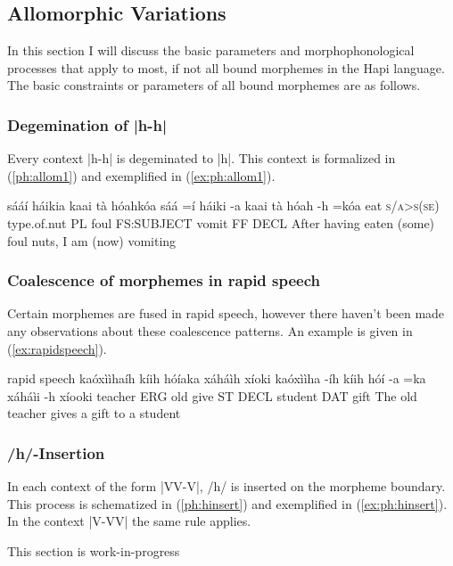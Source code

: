 \documentclass[a4paper, 12pt, oneside]{memoir}
\begin{document}
\subsection{Allomorphic Variations}\label{sallomorphicvariations}
In this section I will discuss the basic parameters and morphophonological processes that apply to most, if not all bound morphemes in the Hapi language. The basic constraints or parameters of all bound morphemes are as follows. 
\subsubsection{Degemination of |h-h|}
Every context |h-h| is degeminated to |h|. This context is formalized in (\ref{ph:allom1}) and exemplified in (\ref{ex:ph:allom1}).
\begin{examples}
\ex \label{ph:allom1} 
\end{examples}
\begin{examples}
\ex\label{ex:ph:allom1}
\words sááí háikia kaai tà hóahkóa
\bits sáá =í háiki -a kaai tà hóah -h =kóa
\gloss eat \textsc{\textup{s/a>s(se)}} type.of.nut PL foul FS:SUBJECT vomit FF DECL
\tr After having eaten (some) foul nuts, I am (now) vomiting
\end{examples}
\subsubsection{Coalescence of morphemes in rapid speech}
Certain morphemes are fused in rapid speech, however there haven't been made any observations about these coalescence patterns. An example is given in (\ref{ex:rapidspeech}).
\begin{examples}
\ex \label{ex:rapidspeech}
\manner rapid speech
\words kaóxììhaíh kíih hóíaka xáháìh xíoki
\bits kaóxììha -íh kíih hóí -a =ka xáháìi -h xíooki
\gloss teacher ERG old give ST DECL student DAT gift
\tr The old teacher gives a gift to a student
\end{examples}
\subsubsection{/h/-Insertion}
In each context of the form |VV-V|, /h/ is inserted on the morpheme boundary. This process is schematized in (\ref{ph:hinsert}) and exemplified in (\ref{ex:ph:hinsert}). In the context |V-VV| the same rule applies.
\begin{examples}
\ex \label{ph:hinsert} 
\ex \label{ex:ph:hinsert}
This section is work-in-progress
\end{examples}
\end{document}

